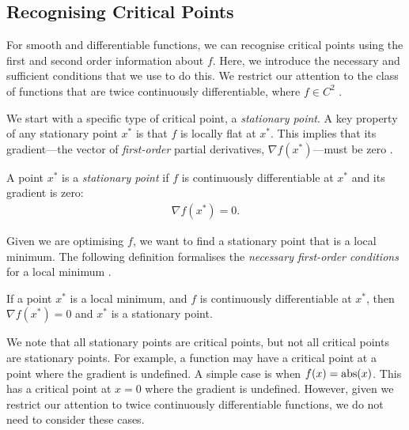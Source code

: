 \subsection{Recognising Critical Points}
\label{ssec:recognising_critical_points}

For smooth and differentiable functions, we can recognise critical points using the first and second order information about $f$. Here, we introduce the necessary and sufficient conditions that we use to do this. We restrict our attention to the class of functions that are twice continuously differentiable, where $f \in C^2$ \citep{NoceWrig06}.

We start with a specific type of critical point, a \textit{stationary point}. A key property of any stationary point $x^*$ is that $f$ is locally flat at $x^*$. This implies that its gradient---the vector of \textit{first-order} partial derivatives, $\nabla f(x^*)$---must be zero \citep{deep_learning_book, mml_book}.
\begin{definition}
    A point $x^*$ is a \textit{stationary point} if $f$ is continuously differentiable at $x^*$ and its gradient is zero:
    \begin{align}
        \nabla f(x^*) = 0.
    \end{align}
\end{definition}

Given we are optimising $f$, we want to find a stationary point that is a local minimum. The following definition formalises the \textit{necessary first-order conditions} for a local minimum \citep{NoceWrig06}.
\begin{definition}
    If a point $x^*$ is a local minimum, and $f$ is continuously differentiable at $x^*$, then $\nabla f(x^*) = 0$ and $x^*$ is a stationary point.
\end{definition}

We note that all stationary points are critical points, but not all critical points are stationary points. For example, a function may have a critical point at a point where the gradient is undefined. A simple case is when $f(x) = \operatorname{abs}({x})$. This has a critical point at $x = 0$ where the gradient is undefined. However, given we restrict our attention to twice continuously differentiable functions, we do not need to consider these cases. 

